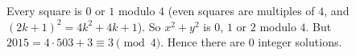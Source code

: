 Every square is $0$ or $1$ modulo $4$ (even squares are multiples of $4$, and $(2k+1)^2=4k^2+4k+1$). So $x^2+y^2$ is $0$, $1$ or $2$ modulo $4$. But $2015=4\cdot503+3\equiv3\pmod4$. Hence there are $\boxed{0}$ integer solutions.
